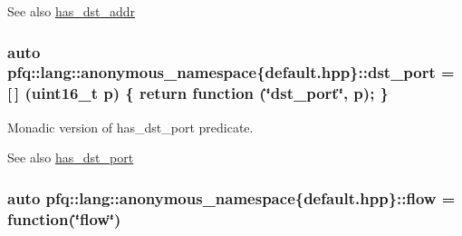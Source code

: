\begin{DoxySeeAlso}{See also}
\hyperlink{namespacepfq_1_1lang_1_1anonymous__namespace_02default_8hpp_03_a0a53822af0ed8ea341f16a1da5ea83e3}{has\+\_\+dst\+\_\+addr} 
\end{DoxySeeAlso}
\subsubsection[{\texorpdfstring{dst\+\_\+port}{dst_port}}]{\setlength{\rightskip}{0pt plus 5cm}auto pfq\+::lang\+::anonymous\+\_\+namespace\{default.\+hpp\}\+::dst\+\_\+port = \mbox{[}$\,$\mbox{]} (uint16\+\_\+t p) \{ return {\bf function} (\char`\"{}dst\+\_\+port\char`\"{}, p); \}}\hypertarget{namespacepfq_1_1lang_1_1anonymous__namespace_02default_8hpp_03_a25a3b35caf255c109a6c5b4f601b1b61}{}\label{namespacepfq_1_1lang_1_1anonymous__namespace_02default_8hpp_03_a25a3b35caf255c109a6c5b4f601b1b61}


Monadic version of {\ttfamily has\+\_\+dst\+\_\+port} predicate. 

\begin{DoxySeeAlso}{See also}
\hyperlink{namespacepfq_1_1lang_1_1anonymous__namespace_02default_8hpp_03_afa71ece0f4178d0200c0388f503eef14}{has\+\_\+dst\+\_\+port} 
\end{DoxySeeAlso}
\subsubsection[{\texorpdfstring{flow}{flow}}]{\setlength{\rightskip}{0pt plus 5cm}auto pfq\+::lang\+::anonymous\+\_\+namespace\{default.\+hpp\}\+::flow = {\bf function}(\char`\"{}flow\char`\"{})}\hypertarget{namespacepfq_1_1lang_1_1anonymous__namespace_02default_8hpp_03_af6c7518847c8c960b0e98cd856871a1b}{}\label{namespacepfq_1_1lang_1_1anonymous__namespace_02default_8hpp_03_af6c7518847c8c960b0e98cd856871a1b}


